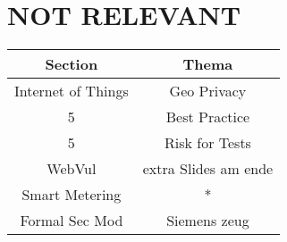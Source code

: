 \documentclass[a4paper, 12pt]{article}
\begin{document}
\section{NOT RELEVANT}
\begin{tabular}{|c|c|} \hline
\textbf{Section} & \textbf{Thema} \\ \hline
Internet of Things & Geo Privacy \\ \hline
5 & Best Practice \\ \hline
5 & Risk for Tests \\ \hline
WebVul & extra Slides am ende \\ \hline
Smart Metering & * \\ \hline
Formal Sec Mod & Siemens zeug \\ \hline



\end{tabular}
\end{document}
